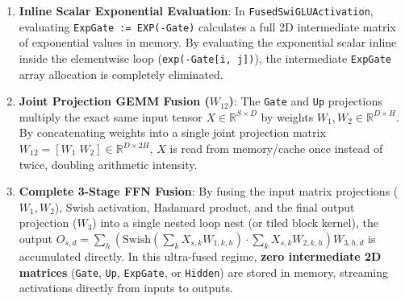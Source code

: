 \begin{enumerate}
    \item \textbf{Inline Scalar Exponential Evaluation}: In \texttt{FusedSwiGLUActivation}, evaluating \texttt{ExpGate := EXP(-Gate)} calculates a full 2D intermediate matrix of exponential values in memory. By evaluating the exponential scalar inline inside the elementwise loop (\texttt{exp(-Gate[i, j])}), the intermediate \texttt{ExpGate} array allocation is completely eliminated.
    \item \textbf{Joint Projection GEMM Fusion ($W_{12}$)}: The \texttt{Gate} and \texttt{Up} projections multiply the exact same input tensor $X \in \mathbb{R}^{S \times D}$ by weights $W_1, W_2 \in \mathbb{R}^{D \times H}$. By concatenating weights into a single joint projection matrix $W_{12} = [W_1 \; W_2] \in \mathbb{R}^{D \times 2H}$, $X$ is read from memory/cache once instead of twice, doubling arithmetic intensity.
    \item \textbf{Complete 3-Stage FFN Fusion}: By fusing the input matrix projections ($W_1, W_2$), Swish activation, Hadamard product, and the final output projection ($W_3$) into a single nested loop nest (or tiled block kernel), the output $O_{s, d} = \sum_h (\text{Swish}(\sum_k X_{s,k} W_{1,k,h}) \cdot \sum_k X_{s,k} W_{2,k,h}) W_{3,h,d}$ is accumulated directly. In this ultra-fused regime, \textbf{zero intermediate 2D matrices} (\texttt{Gate}, \texttt{Up}, \texttt{ExpGate}, or \texttt{Hidden}) are stored in memory, streaming activations directly from inputs to outputs.
\end{enumerate}

